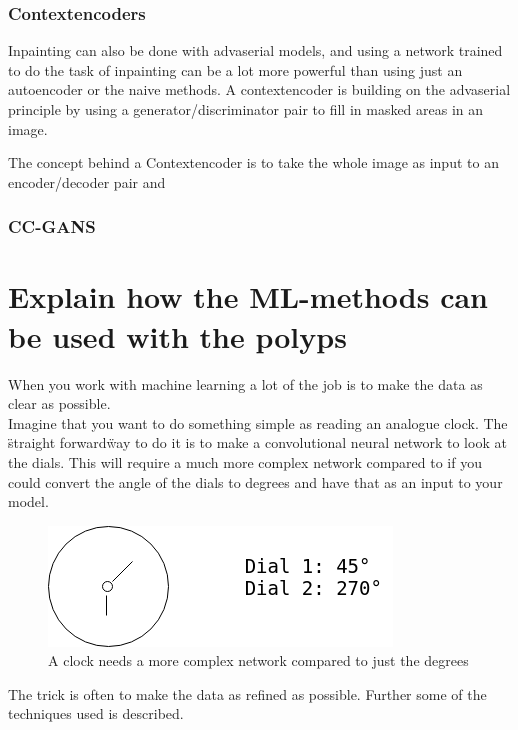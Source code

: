 \subsubsection{Contextencoders}
Inpainting can also be done with advaserial models, and using a network trained to do the task of inpainting can be a lot more powerful than using just an autoencoder or the naive methods.
A contextencoder is building on the advaserial principle by using a generator/discriminator pair to fill in masked areas in an image. 
	
The concept behind a Contextencoder is to take the whole image as input to an encoder/decoder pair and 
     
\subsubsection{CC-GANS}  
      
    



	    
	  
\section{Explain how the ML-methods can be used with the polyps}
	When you work with machine learning a lot of the job is to make the data as clear as possible. \\
	Imagine that you want to do something simple as reading an analogue clock. The \"straight forward\" way to do it is to  
	make a convolutional neural network to look at the dials. This will require a much more complex network compared to if you could convert the angle of the dials
	to degrees and have that as an input to your model.

	\begin{figure}[ht]
	  \centering
	  \includegraphics[scale=0.5]{methods/figures/Clock.png}
	  \caption{A clock needs a more complex network compared to just the degrees}
	\end{figure}
	The trick is often to make the data as refined as possible. 
	Further some of the techniques used is described.
	
